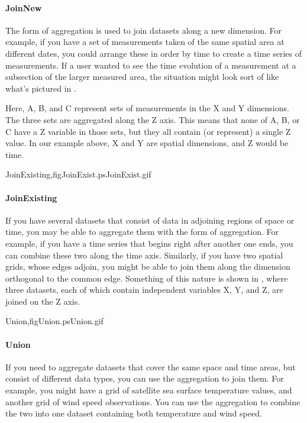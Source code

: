 \documentclass{dods-book}
\begin{document}


\paragraph{JoinNew}
The  form of aggregation is used to join datasets along
a new dimension.  For example, if you have a set of measurements taken
of the same spatial area at different dates, you could arrange these
in order by time to create a time series of measurements.  If a user
wanted to see the time evolution of a measurement at a subsection of
the larger measured area, the situation might look sort of like what's
pictured in .

Here, A, B, and C represent sets of measurements in the X and Y
dimensions.  The three sets are aggregated along the Z axis.  This
means that none of A, B, or C have a Z variable in those sets, but
they all contain (or represent) a single Z value.  In our example
above, X and Y are spatial dimensions, and Z would be time.  

{JoinExisting,fig}{JoinExist.ps}{JoinExist.gif}{}

\paragraph{JoinExisting} If you
have several datasets that consist of data in adjoining regions of
space or time, you may be able to aggregate them with the
 form of aggregation.  For example, if you have a
time series that begins right after another one ends, you can combine
these two along the time axis.  Similarly, if you have two spatial
grids, whose edges adjoin, you might be able to join them along the
dimension orthogonal to the common edge.  Something of this nature is
shown in , where three datasets, each of
which contain independent variables X, Y, and Z, are joined on the Z
axis.

{Union,fig}{Union.ps}{Union.gif}{}

\paragraph{Union}  If you need to aggregate datasets that cover
the same space and time areas, but consist of different data types,
you can use the  aggregation to join them.  
For example,
you might have a grid of satellite sea surface temperature values, and
another grid of wind speed observations.  You can use the
 aggregation to combine the two into one dataset
containing both temperature and wind speed.
\end{document}
